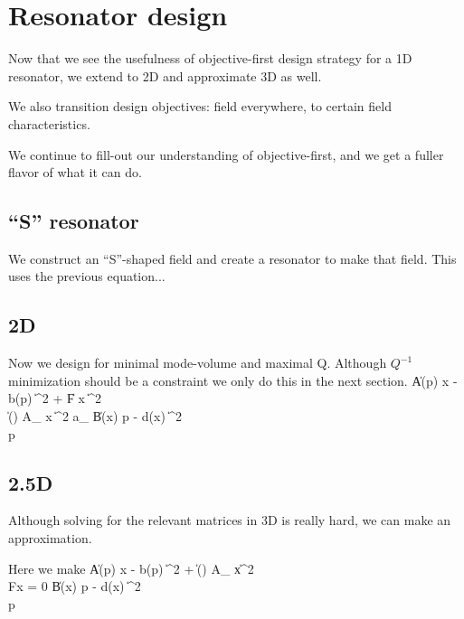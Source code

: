 \section{Resonator design}
Now that we see the usefulness of objective-first design strategy for a 1D resonator,
    we extend to 2D and approximate 3D as well.

We also transition design objectives:
    field everywhere,
    to certain field characteristics.

We continue to fill-out our understanding of objective-first,
    and we get a fuller flavor of what it can do.

\subsection{``S'' resonator}
We construct an ``S''-shaped field and create a resonator to make that field.
This uses the previous equation...

\subsection{2D}
Now we design for minimal mode-volume and maximal Q.
Although $Q^{-1}$ minimization should be a constraint we only do this in the next section.
\BA {} \| A(p) x - b(p) \|^2 + \eta \| F x \|^2 \\
    \subto \| () A_ x \|^2 \le a_ \EA
\BA {} \| B(x) p - d(x) \|^2 \\
     \le p  \EA
{}

\subsection{2.5D}
Although solving for the relevant matrices in 3D is really hard, we can make an approximation.

Here we make 
\BA {} \| A(p) x - b(p) \|^2 + \eta \|() A_ x\|^2 \\
    \subto Fx = 0  \EA
\BA {} \| B(x) p - d(x) \|^2 \\
     \le p  \EA



